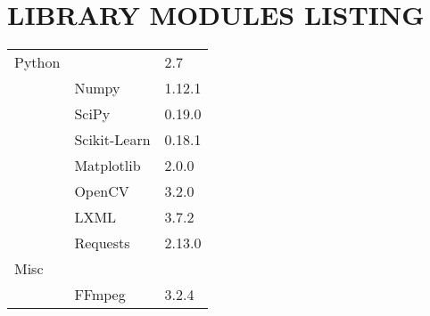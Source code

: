 \chapter{LIBRARY MODULES LISTING}\label{app:tech}

\begin{table}[!htb]
  \centering
  \begin{tabular}{l l l}
    Python  &             & 2.7         \\
&       Numpy         &    1.12.1  \\
&       SciPy         &    0.19.0  \\
&       Scikit-Learn  &    0.18.1  \\
&       Matplotlib    &    2.0.0   \\
&       OpenCV        &    3.2.0   \\
&       LXML          &    3.7.2   \\
&       Requests      &    2.13.0\\
    Misc & &\\
    & FFmpeg & 3.2.4
  \end{tabular}
\end{table}
